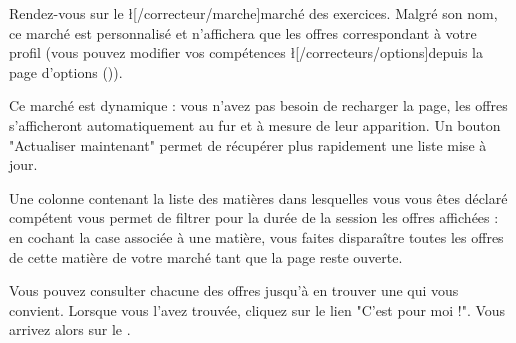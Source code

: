 ﻿Rendez-vous sur le \l[/correcteur/marche]{marché des exercices}. Malgré son nom, ce marché est personnalisé et n'affichera que les offres correspondant à votre profil (vous pouvez modifier vos compétences \l[/correcteurs/options]{depuis la page d'options} ()).

Ce marché est dynamique : vous n'avez pas besoin de recharger la page, les offres s'afficheront automatiquement au fur et à mesure de leur apparition. Un bouton "Actualiser maintenant" permet de récupérer plus rapidement une liste mise à jour.

Une colonne contenant la liste des matières dans lesquelles vous vous êtes déclaré compétent vous permet de filtrer pour la durée de la session les offres affichées : en cochant la case associée à une matière, vous faites disparaître toutes les offres de cette matière de votre marché tant que la page reste ouverte.

Vous pouvez consulter chacune des offres jusqu'à en trouver une qui vous convient.
Lorsque vous l'avez trouvée, cliquez sur le lien "C'est pour moi !".
Vous arrivez alors sur le .